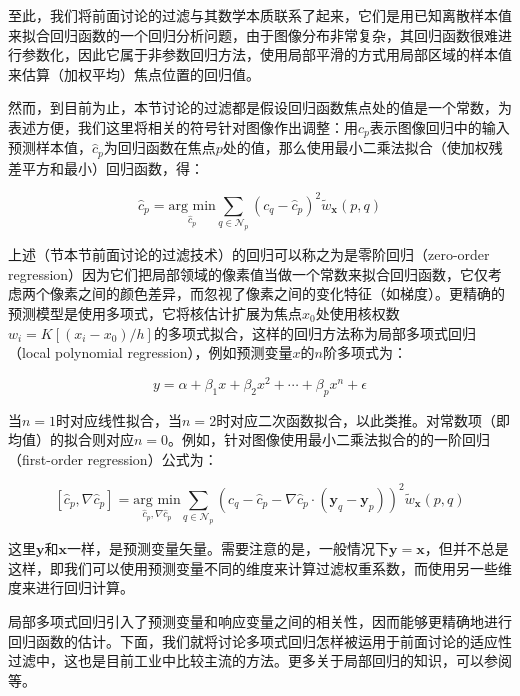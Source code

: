 至此，我们将前面讨论的过滤与其数学本质联系了起来，它们是用已知离散样本值来拟合回归函数的一个回归分析问题，由于图像分布非常复杂，其回归函数很难进行参数化，因此它属于非参数回归方法，使用局部平滑的方式用局部区域的样本值来估算（加权平均）焦点位置的回归值。

然而，到目前为止，本节讨论的过滤都是假设回归函数焦点处的值是一个常数，为表述方便，我们这里将相关的符号针对图像作出调整：用$c_p$表示图像回归中的输入预测样本值，$\hat{c}_p$为回归函数在焦点$p$处的值，那么使用最小二乘法拟合（使加权残差平方和最小）回归函数，得：

\begin{equation}
	\hat{c}_p=\underset{\hat{c}_p}{\text{arg min}}\sum_{q\in\mathcal{N}_p}(c_q-\hat{c}_p)^{2}\tilde{w}_\mathbf{x}(p,q)
\end{equation}

\noindent 上述（节本节前面讨论的过滤技术）的回归可以称之为是零阶回归（zero-order regression）因为它们把局部领域的像素值当做一个常数来拟合回归函数，它仅考虑两个像素之间的颜色差异，而忽视了像素之间的变化特征（如梯度）。更精确的预测模型是使用多项式，它将核估计扩展为焦点$x_0$处使用核权数$w_i=K[(x_i-x_0)/h]$的多项式拟合，这样的回归方法称为局部多项式回归（local polynomial regression），例如预测变量$x$的$n$阶多项式为：

\begin{equation}
	y=\alpha+\beta_1 x+\beta_2 x^{2}+\cdots+\beta_p x^{n}+\epsilon
\end{equation}

\noindent 当$n=1$时对应线性拟合，当$n=2$时对应二次函数拟合，以此类推。对常数项（即均值）的拟合则对应$n=0$。例如，针对图像使用最小二乘法拟合的的一阶回归（first-order regression）公式为：

\begin{equation}\label{e:pt-first-order-regression}
	[\hat{c}_p,\nabla\hat{c}_p]=\underset{\hat{c}_p,\nabla\hat{c}_p}{\text{arg min}}\sum_{q\in\mathcal{N}_p}(c_q-\hat{c}_p-\nabla\hat{c}_p\cdot (\mathbf{y}_q-\mathbf{y}_p))^{2}\tilde{w}_\mathbf{x}(p,q)
\end{equation}

\noindent 这里$\mathbf{y}$和$\mathbf{x}$一样，是预测变量矢量。需要注意的是，一般情况下$\mathbf{y}=\mathbf{x}$，但并不总是这样，即我们可以使用预测变量不同的维度来计算过滤权重系数，而使用另一些维度来进行回归计算。

局部多项式回归引入了预测变量和响应变量之间的相关性，因而能够更精确地进行回归函数的估计。下面，我们就将讨论多项式回归怎样被运用于前面讨论的适应性过滤中，这也是目前工业中比较主流的方法。更多关于局部回归的知识，可以参阅\cite{b:LocalRegressionandLikelihood, b:nonparametricregression,a:SmoothingbyLocalRegression:PrinciplesandMethods}等。







